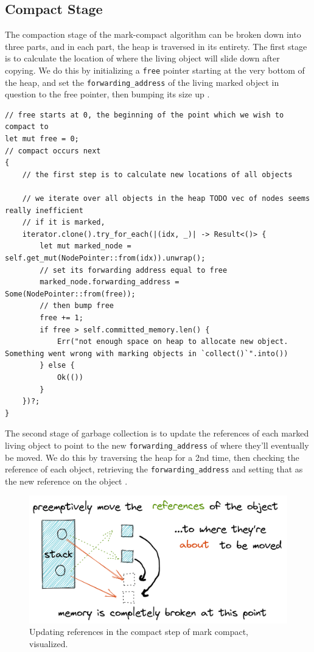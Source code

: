 \documentclass[index]{subfiles}
\begin{document}
\subsection{Compact Stage}

The compaction stage of the mark-compact algorithm can be broken down into three parts, and in each part, the heap is traversed in its entirety. The first stage is to calculate the location of where the living object will slide down after copying. We do this by initializing a \verb+free+ pointer starting at the very bottom of the heap, and set the \verb+forwarding_address+ of the living marked object in question to the free pointer, then bumping its size up \cites[Chapter~3]{gc_handbook}[Sections~3.3-3.5]{redhat_openjdk}.

\begin{verbatim}
// free starts at 0, the beginning of the point which we wish to compact to
let mut free = 0;
// compact occurs next
{
    // the first step is to calculate new locations of all objects

    // we iterate over all objects in the heap TODO vec of nodes seems really inefficient
    // if it is marked,
    iterator.clone().try_for_each(|(idx, _)| -> Result<()> {
        let mut marked_node = self.get_mut(NodePointer::from(idx)).unwrap();
        // set its forwarding address equal to free
        marked_node.forwarding_address = Some(NodePointer::from(free));
        // then bump free
        free += 1;
        if free > self.committed_memory.len() {
            Err("not enough space on heap to allocate new object. Something went wrong with marking objects in `collect()`".into())
        } else {
            Ok(())
        }
    })?;
}
\end{verbatim}

The second stage of garbage collection is to update the references of each marked living object to point to the new \verb+forwarding_address+ of where they'll eventually be moved. We do this by traversing the heap for a 2nd time, then checking the reference of each object, retrieving the \verb+forwarding_address+ and setting that as the new reference on the object \cites[Chapter 3]{gc_handbook}[Sec. 3.4]{redhat_openjdk}.

\begin{figure}[H]
    \centering
    \includegraphics[scale=0.3]{pics/update-references.png}
    \caption{Updating references in the compact step of mark compact, visualized.}
\end{figure}
\end{document}
